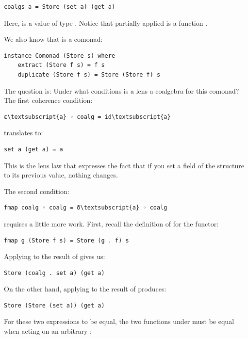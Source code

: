 \begin{verbatim}
coalgs a = Store (set a) (get a)
\end{verbatim}
Here,  is a value of type . Notice that partially
applied  is a function .

We also know that  is a comonad:

\begin{verbatim}
instance Comonad (Store s) where
    extract (Store f s) = f s
    duplicate (Store f s) = Store (Store f) s
\end{verbatim}
The question is: Under what conditions is a lens a coalgebra for this
comonad? The first coherence condition:

\begin{Verbatim}[commandchars=\\\{\}]
ε\textsubscript{a} ◦ coalg = id\textsubscript{a}
\end{Verbatim}
translates to:

\begin{verbatim}
set a (get a) = a
\end{verbatim}
This is the lens law that expresses the fact that if you set a field of
the structure  to its previous value, nothing changes.

The second condition:

\begin{Verbatim}[commandchars=\\\{\}]
fmap coalg ◦ coalg = δ\textsubscript{a} ◦ coalg
\end{Verbatim}
requires a little more work. First, recall the definition of
 for the  functor:

\begin{verbatim}
fmap g (Store f s) = Store (g . f) s
\end{verbatim}
Applying  to the result of  gives us:

\begin{verbatim}
Store (coalg . set a) (get a)
\end{verbatim}
On the other hand, applying  to the result of
 produces:

\begin{verbatim}
Store (Store (set a)) (get a)
\end{verbatim}
For these two expressions to be equal, the two functions under
 must be equal when acting on an arbitrary :

